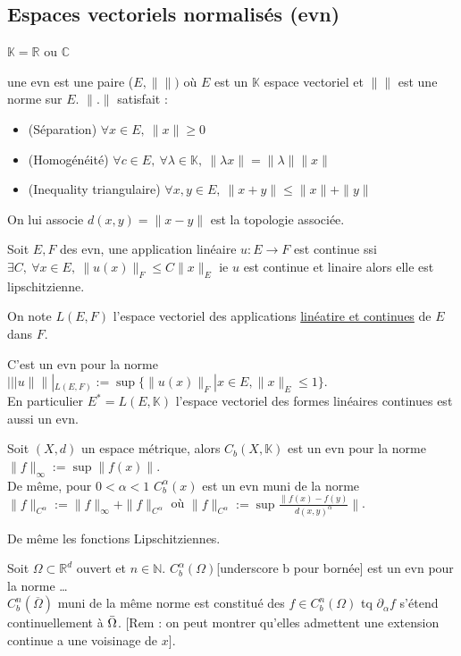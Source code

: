 \subsection{Espaces vectoriels normalisés (evn)}
 $\mathbb{K}=\mathbb{R}$ ou $\mathbb{C}$
\begin{definition}
    une evn est une paire ($E,\|\|)$ où $E$ est un $\mathbb{K}$ espace vectoriel et $\|\|$ est une norme sur $E$. $\|.\|$ satisfait :
    \begin{itemize}
        \item (Séparation) $\forall x\in E,\ \|x\|\ge 0$
        \item (Homogénéité) $\forall c\in E,\ \forall  \lambda\in \mathbb{K},\ \|\lambda x\|=\|\lambda\|\|x\|$
        \item (Inequality triangulaire) $\forall x,y \in E,\ \|x+y\|\le \|x\|+\|y\|$
    \end{itemize}
\end{definition}

On lui associe $d(x,y)=\|x-y\|$ est la topologie associée.

\begin{propriete}
    Soit $E,F$ des evn, une application linéaire $u:E\to F$ est continue ssi $\exists C,\ \forall x\in E,\ \|u(x)\|_F\le C\|x\|_E$ ie $u$ est continue et linaire alors elle est lipschitzienne.
\end{propriete}

On note $L(E,F)$ l'espace vectoriel des applications \underline{linéatire et continues} de $E$ dans $F$.

C'est un evn pour la norme $\mid ||u\|\| |_{L(E,F)}:=\sup\{\|u(x)\|_F|x\in E, \|x\|_E\le 1\} $. \\
En particulier $E^*=L(E,\mathbb{K})$ l'espace vectoriel des formes linéaires continues est aussi un evn.

\begin{ex}
    Soit $(X,d)$ un espace métrique, alors $C_b(X,\mathbb{K})$ est un evn pour la norme $\|f\|_\infty :=\sup\|f(x)\|$.\\
    De même, pour $ 0<\alpha <1$ $C^\alpha_b(x)$ est un evn muni de la norme $\|f\|_{C^\alpha }:=\|f\|_\infty +\|f\|_{C^\alpha }$ où $\|f\|_{C^\alpha }:=\sup \frac{\|f(x)-f(y)}{d(x,y)^\alpha }\|$.
\end{ex}
De même les fonctions Lipschitziennes.

\begin{ex}
    Soit $\Omega\subset \mathbb{R} ^d$ ouvert et $n\in \mathbb{N} $. $C^\alpha _b(\Omega)$[underscore b pour bornée] est un evn pour la norme \ldots\\
    $C^n_b(\overline{\Omega})$ muni de la même norme est constitué des $f\in C^n_b(\Omega)$ tq $\partial_\alpha f$ s'étend continuellement à $\Bar{\Omega}$. [Rem : on peut montrer qu'elles admettent une extension continue a une voisinage de $x$].
\end{ex}


